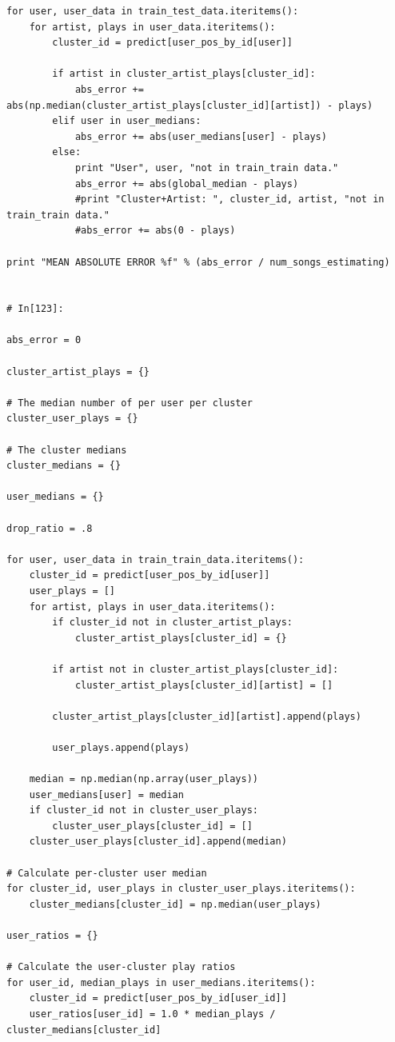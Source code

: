 \documentclass[11pt]{article}
\begin{document}
\begin{lstlisting}
for user, user_data in train_test_data.iteritems():
    for artist, plays in user_data.iteritems():
        cluster_id = predict[user_pos_by_id[user]]
        
        if artist in cluster_artist_plays[cluster_id]:
            abs_error += abs(np.median(cluster_artist_plays[cluster_id][artist]) - plays)
        elif user in user_medians:
            abs_error += abs(user_medians[user] - plays)
        else:
            print "User", user, "not in train_train data."
            abs_error += abs(global_median - plays)
            #print "Cluster+Artist: ", cluster_id, artist, "not in train_train data."
            #abs_error += abs(0 - plays)
            
print "MEAN ABSOLUTE ERROR %f" % (abs_error / num_songs_estimating)


# In[123]:

abs_error = 0

cluster_artist_plays = {}

# The median number of per user per cluster
cluster_user_plays = {}

# The cluster medians
cluster_medians = {}

user_medians = {}

drop_ratio = .8

for user, user_data in train_train_data.iteritems():
    cluster_id = predict[user_pos_by_id[user]]
    user_plays = []
    for artist, plays in user_data.iteritems():
        if cluster_id not in cluster_artist_plays:
            cluster_artist_plays[cluster_id] = {}
        
        if artist not in cluster_artist_plays[cluster_id]:
            cluster_artist_plays[cluster_id][artist] = []
        
        cluster_artist_plays[cluster_id][artist].append(plays)

        user_plays.append(plays)

    median = np.median(np.array(user_plays))
    user_medians[user] = median
    if cluster_id not in cluster_user_plays:
        cluster_user_plays[cluster_id] = []
    cluster_user_plays[cluster_id].append(median) 
    
# Calculate per-cluster user median
for cluster_id, user_plays in cluster_user_plays.iteritems():
    cluster_medians[cluster_id] = np.median(user_plays)
    
user_ratios = {}
    
# Calculate the user-cluster play ratios
for user_id, median_plays in user_medians.iteritems():
    cluster_id = predict[user_pos_by_id[user_id]]
    user_ratios[user_id] = 1.0 * median_plays / cluster_medians[cluster_id]
        

\end{lstlisting}
\end{document}

